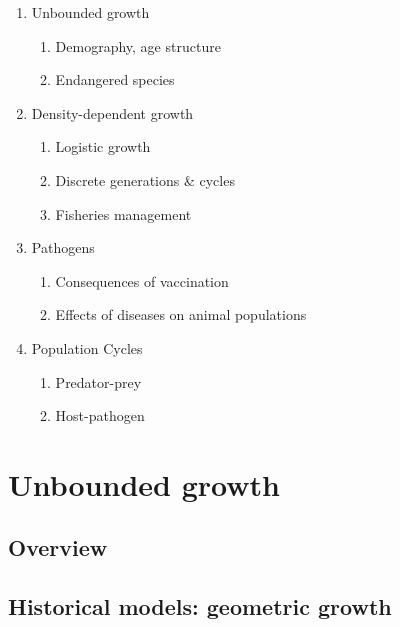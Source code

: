 \documentclass[
  letterpaper,
]{scrbook}
\providecommand{\tightlist}{%
  \setlength{\itemsep}{0pt}\setlength{\parskip}{0pt}}\usepackage{longtable,booktabs,array}
\begin{document}
\begin{enumerate}
\def\labelenumi{\arabic{enumi}.}
\tightlist
\item
  Unbounded growth

  \begin{enumerate}
  \def\labelenumii{\alph{enumii}.}
  \tightlist
  \item
    Demography, age structure
  \item
    Endangered species
  \end{enumerate}
\item
  Density-dependent growth

  \begin{enumerate}
  \def\labelenumii{\alph{enumii}.}
  \tightlist
  \item
    Logistic growth
  \item
    Discrete generations \& cycles
  \item
    Fisheries management
  \end{enumerate}
\item
  Pathogens

  \begin{enumerate}
  \def\labelenumii{\alph{enumii}.}
  \tightlist
  \item
    Consequences of vaccination
  \item
    Effects of diseases on animal populations
  \end{enumerate}
\item
  Population Cycles

  \begin{enumerate}
  \def\labelenumii{\alph{enumii}.}
  \tightlist
  \item
    Predator-prey
  \item
    Host-pathogen
  \end{enumerate}
\end{enumerate}


\chapter{Unbounded growth}\label{unbounded-growth}

\section{Overview}\label{sec-intro-overview}

\section{Historical models: geometric
growth}\label{historical-models-geometric-growth}
\end{document}

